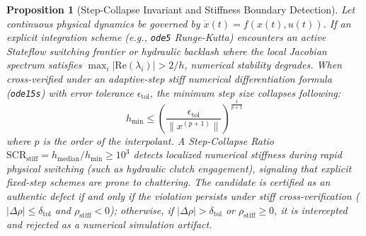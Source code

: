 \documentclass[journal]{IEEEtran}
\newtheorem{proposition}{Proposition}
\begin{document}
\begin{proposition}[Step-Collapse Invariant and Stiffness Boundary Detection]
\label{prop:scr_invariant}
Let continuous physical dynamics be governed by $\dot{x}(t) = f(x(t), u(t))$. If an explicit integration scheme (e.g., \texttt{ode5} Runge-Kutta) encounters an active Stateflow switching frontier or hydraulic backlash where the local Jacobian spectrum satisfies $\max_i |\mathrm{Re}(\lambda_i)| > 2/h$, numerical stability degrades. When cross-verified under an adaptive-step stiff numerical differentiation formula (\texttt{ode15s}) with error tolerance $\epsilon_{\text{tol}}$, the minimum step size collapses following:
\begin{equation}
h_{\min} \le \left( \frac{\epsilon_{\text{tol}}}{\|x^{(p+1)}\|} \right)^{\frac{1}{p+1}}
\end{equation}
where $p$ is the order of the interpolant. A Step-Collapse Ratio $\text{SCR}_{\text{stiff}} = h_{\text{median}} / h_{\min} \ge 10^3$ detects localized numerical stiffness during rapid physical switching (such as hydraulic clutch engagement), signaling that explicit fixed-step schemes are prone to chattering. The candidate is certified as an authentic defect if and only if the violation persists under stiff cross-verification ($|\Delta \rho| \le \delta_{\text{tol}}$ and $\rho_{\text{stiff}} < 0$); otherwise, if $|\Delta \rho| > \delta_{\text{tol}}$ or $\rho_{\text{stiff}} \ge 0$, it is intercepted and rejected as a numerical simulation artifact.
\end{proposition}

\begin{table}[!t]
\caption{Systematic Hyperparameter Governance}
\label{tab:hyperparameters}
\centering
{}
\end{table}
\end{document}
